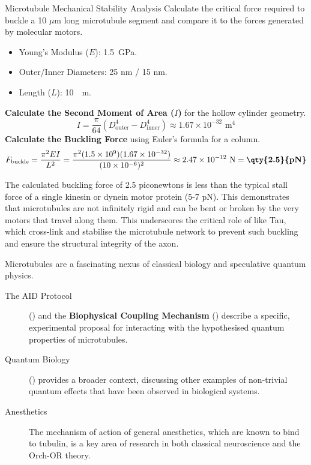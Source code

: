 \begin{workedexample}{Microtubule Mechanical Stability Analysis}
     Calculate the critical force required to buckle a 10 $\mu$m long microtubule segment and compare it to the forces generated by molecular motors.
    \begin{itemize}
        \item Young's Modulus ($E$): \qty{1.5}{GPa}.
        \item Outer/Inner Diameters: 25 nm / 15 nm.
        \item Length ($L$): \qty{10}{\mu m}.
    \end{itemize}
    \begin{derivationsteps}
        \step \textbf{Calculate the Second Moment of Area ($I$)} for the hollow cylinder geometry.
        \[ I = \frac{\pi}{64}(D_{\text{outer}}^4 - D_{\text{inner}}^4) \approx 1.67 \times 10^{-32} \text{ m}^4 \]
        \step \textbf{Calculate the Buckling Force} using Euler's formula for a column.
        \[ F_{\text{buckle}} = \frac{\pi^2 EI}{L^2} = \frac{\pi^2 (1.5 \times 10^9)(1.67 \times 10^{-32})}{(10 \times 10^{-6})^2} \approx 2.47 \times 10^{-12} \text{ N} = \textbf{\qty{2.5}{pN}} \]
    \end{derivationsteps}
     The calculated buckling force of 2.5 piconewtons is less than the typical stall force of a single kinesin or dynein motor protein (5-7 pN). This demonstrates that microtubules are not infinitely rigid and can be bent or broken by the very motors that travel along them. This underscores the critical role of  like Tau, which cross-link and stabilise the microtubule network to prevent such buckling and ensure the structural integrity of the axon.
\end{workedexample}


\begin{importantbox}[title={Further Reading}]
    Microtubules are a fascinating nexus of classical biology and speculative quantum physics.
    \begin{description}
        \item[The AID Protocol] () and the \textbf{Biophysical Coupling Mechanism} () describe a specific, experimental proposal for interacting with the hypothesised quantum properties of microtubules.
        \item[Quantum Biology] () provides a broader context, discussing other examples of non-trivial quantum effects that have been observed in biological systems.
        \item[Anesthetics] The mechanism of action of general anesthetics, which are known to bind to tubulin, is a key area of research in both classical neuroscience and the Orch-OR theory.
    \end{description}
\end{importantbox}
